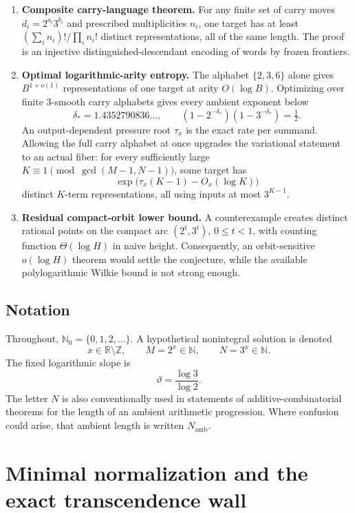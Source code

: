 \documentclass[11pt,oneside]{article}
\theoremstyle{definition}
\newcommand{\R}{\mathbb{R}}
\newcommand{\Z}{\mathbb{Z}}
\newcommand{\N}{\mathbb{N}}
\begin{document}
\begin{resultbox}
\begin{enumerate}
\item \textbf{Composite carry-language theorem.}  For any finite set of carry moves $d_i=2^{a_i}3^{b_i}$ and prescribed multiplicities $n_i$, one target has at least $(\sum_i n_i)!/\prod_i n_i!$ distinct representations, all of the same length.  The proof is an injective distinguished-descendant encoding of words by frozen frontiers.

\item \textbf{Optimal logarithmic-arity entropy.}  The alphabet $\{2,3,6\}$ alone gives $B^{1+o(1)}$ representations of one target at arity $O(\log B)$.  Optimizing over finite $3$-smooth carry alphabets gives every ambient exponent below
\[
  \delta_*=1.4352790836\ldots,
  \qquad (1-2^{-\delta_*})(1-3^{-\delta_*})=\tfrac12.
\]
An output-dependent pressure root $\tau_x$ is the exact rate per summand.  Allowing the full carry alphabet at once upgrades the variational statement to an actual fiber: for every sufficiently large $K\equiv1\pmod{\gcd(M-1,N-1)}$, some target has
\[
       \exp\bigl(\tau_x(K-1)-O_x(\log K)\bigr)
\]
distinct $K$-term representations, all using inputs at most $3^{K-1}$.

\item \textbf{Residual compact-orbit lower bound.}  A counterexample creates distinct rational points on the compact arc $(2^t,3^t)$, $0\le t<1$, with counting function $\Theta(\log H)$ in naive height.  Consequently, an orbit-sensitive $o(\log H)$ theorem would settle the conjecture, while the available polylogarithmic Wilkie bound is not strong enough.
\end{enumerate}
\end{resultbox}

\subsection{Notation}

Throughout, $\N_0=\{0,1,2,\ldots\}$.  A hypothetical nonintegral solution is denoted
\[
       x\in\R\setminus\Z,\qquad M=2^x\in\N,
       \qquad N=3^x\in\N.
\]
The fixed logarithmic slope is
\[
       \vartheta=\frac{\log 3}{\log 2}.
\]
The letter $N$ is also conventionally used in statements of additive-combinatorial theorems for the length of an ambient arithmetic progression.  Where confusion could arise, that ambient length is written $N_{\mathrm{amb}}$.

\section{Minimal normalization and the exact transcendence wall}
\end{document}
